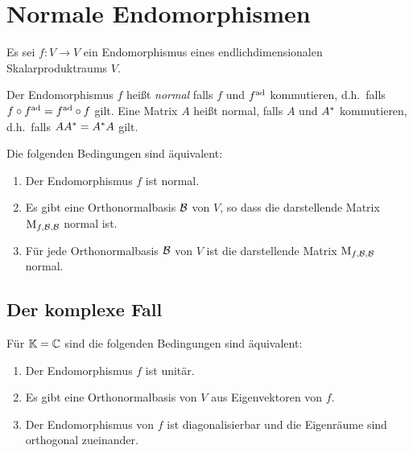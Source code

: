 \section{Normale Endomorphismen}

Es sei $f \colon V \to V$ ein Endomorphismus eines endlichdimensionalen Skalarproduktraums $V$.

\begin{definition}
  Der Endomorphismus $f$ heißt \emph{normal} falls $f$ und $f^{\operatorname{ad}}$ kommutieren, d.h.\ falls $f \circ f^{\operatorname{ad}} = f^{\operatorname{ad}} \circ f$ gilt.
  Eine Matrix $A$ heißt normal, falls $A$ und $A^*$ kommutieren, d.h.\ falls $A A^* = A^* A$ gilt.
\end{definition}

\begin{lemma}
  Die folgenden Bedingungen sind äquivalent:
  \begin{enumerate}
    \item
      Der Endomorphismus $f$ ist normal.
    \item
      Es gibt eine Orthonormalbasis $\mathcal{B}$ von $V$, so dass die darstellende Matrix $\operatorname{M}_{f, \mathcal{B}, \mathcal{B}}$ normal ist.
    \item
      Für jede Orthonormalbasis $\mathcal{B}$ von $V$ ist die darstellende Matrix $\operatorname{M}_{f, \mathcal{B}, \mathcal{B}}$ normal.
  \end{enumerate}
\end{lemma}



\subsection{Der komplexe Fall}

\begin{theorem}
  Für $\mathbb{K} = \mathbb{C}$ sind die folgenden Bedingungen sind äquivalent:
  \begin{enumerate}
    \item
      Der Endomorphismus $f$ ist unitär.
    \item
      Es gibt eine Orthonormalbasis von $V$ aus Eigenvektoren von $f$.
    \item
      Der Endomorphismus von $f$ ist diagonalisierbar und die Eigenräume sind orthogonal zueinander.
  \end{enumerate}
\end{theorem}

